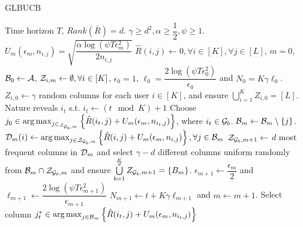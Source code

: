 \begin{algorithm}[!th]
\caption{GLBUCB}
\label{alg:NGLB}
\begin{algorithmic}[1]
 Time horizon $T$, $Rank(\bar{R}) = d$.
 $\gamma \geq d^2, \alpha \geq  \dfrac{1}{2}, \psi \geq 1$.
 $U_m(\epsilon_m, n_{i,j}) = \sqrt{\dfrac{\alpha\log(\psi T\epsilon_m^2)}{2n_{i,j}} }$
 $\hat{R}(i,j) \leftarrow 0, \forall i\in [K], \forall j\in [L]$, $m=0$, $\mathcal{B}_0 \leftarrow \mathcal{A}$, $\mathcal{Z}_{i,m}\leftarrow \emptyset , \forall i\in[K]$, $\epsilon_0=1$, $\ell_0 =  \dfrac{2\log(\psi T\epsilon_{0}^2)}{\epsilon_{0}} $ and $N_0 =  K\gamma \ell_0 $.
\State $Z_{i, 0}\leftarrow  \gamma$ random columns for each user $i\in [K]$, and ensure $\bigcup\limits_{i=1}^{K}Z_{i,0} = [L]$. 
\State Nature reveals $i_t$ s.t. $i_t \leftarrow (t \mod K) + 1$ 
  
\State Choose $j_0 \in \mathop{\rm arg\,max}_{j\in_{\mathcal{Z}_{\mathcal{G}_b,m}}}\left\lbrace \hat{R}(i_t,j)  + U_m(\epsilon_m, n_{i_t,j})\right\rbrace $, where $i_t\in \mathcal{G}_b$.
\Else {}
\ColElim
\State {}
\State {}
\State $\mathcal{B}_m \leftarrow \mathcal{B}_m \setminus \lbrace j \rbrace$. 
\EndWhile
\EndFor
\EndColElim
\ResParam
{} 
\State $\mathcal{D}_{m}(i) \leftarrow \mathop{\rm arg\,max}_{j\in\mathcal{Z}_{\mathcal{G}_b,m}}\left\lbrace \hat{R}(i,j)  + U_m(\epsilon_m, n_{i,j})\right\rbrace, \forall j\in \mathcal{B}_m$
\EndFor
{} 
\State $\mathcal{Z}_{\mathcal{G}_b,m+1}\leftarrow$ $d$ most frequent columns in $\mathcal{D}_m$ and select $\gamma - d$ different columns uniform randomly from $\mathcal{B}_m\cap\mathcal{Z}_{\mathcal{G}_b,m}$ and ensure $\bigcup\limits_{b=1}^{\frac{K}{d}}Z_{\mathcal{G}_b,m+1} = \lbrace B_m\rbrace$.
\EndFor
\State $\epsilon_{m+1} \leftarrow \dfrac{\epsilon_m}{2}$ and $\ell_{m+1} \leftarrow \dfrac{2\log(\psi T\epsilon_{m+1}^2)}{\epsilon_{m+1}}$
\State $N_{m+1}\leftarrow t + K \gamma \ell_{m+1} $ and $m \leftarrow m + 1$.
\EndResParam
\EndIf
\Else {}
\State  Select column $j_t^*\in \mathop{\rm arg\,max}_{j\in\mathcal{B}_m} \left\lbrace \hat{R}(i_t,j) + U_m(\epsilon_m, n_{i_t,j})\right\rbrace$ 
\EndIf
\EndFor
\end{algorithmic}
\end{algorithm}


